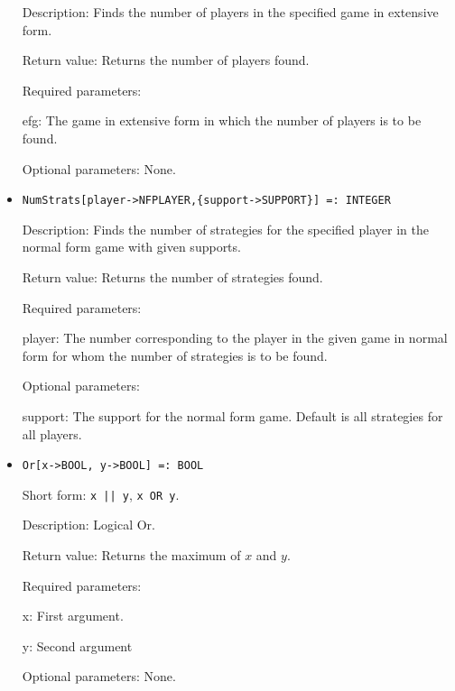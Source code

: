 \begin{itemize}
\bd
\item
[Description:] Finds the number of players in the specified game in
extensive form.
\item
[Return value:] Returns the number of players found.
\item
[Required parameters:]\hfil\null

\bd
\item
[efg:] The game in extensive form in which the number of players is
to be found.
\ed

\item   
[Optional parameters:] None.
\ed

\item
\protect \large \begin{verbatim}
NumStrats[player->NFPLAYER,{support->SUPPORT}] =: INTEGER
\end{verbatim}\normalsize

\bd

\item
[Description:] Finds the number of strategies for the specified player
in the normal form game with given supports.
\item
[Return value:] Returns the number of strategies found.
\item
[Required parameters:]\hfil\null

\bd
\item
[player:] The number corresponding to the player in the given game in
normal form for whom the number of strategies is to be found.
\ed

\item
[Optional parameters:]\hfil\null
	
\bd
\item  
[support:] The support for the normal form game.  Default is all
strategies for all players.  
\ed
\ed


\item 
\protect \large \begin{verbatim}
Or[x->BOOL, y->BOOL] =: BOOL
\end{verbatim} \normalsize
  
\bd
\item
[Short form:] \verb+x || y+, \verb+x OR y+.
\item
[Description:] Logical Or.
\item
[Return value:] Returns the maximum of $x$ and $y$.  
\item
[Required parameters:]\hfil\null
\bd
\item
[x:] First argument.  
\item
[y:] Second argument
\ed
\item
[Optional parameters:] None.
\ed


\end{itemize}
